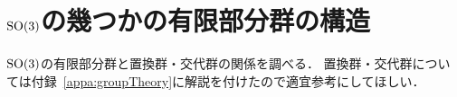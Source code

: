 %
%



\section{$\operatorname{SO}(3)$の幾つかの有限部分群の構造}
$\operatorname{SO}(3)$の有限部分群と置換群・交代群の関係を調べる．
置換群・交代群については付録~\ref{appa:groupTheory}に解説を付けたので適宜参考にしてほしい．

